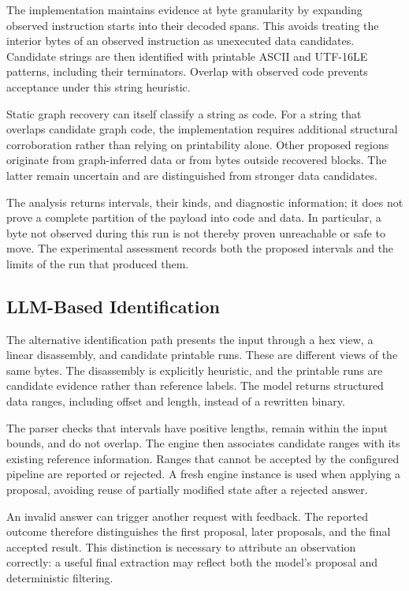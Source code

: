 The implementation maintains evidence at byte granularity by expanding
observed instruction starts into their decoded spans. This avoids
treating the interior bytes of an observed instruction as unexecuted
data candidates. Candidate strings are then identified with printable
ASCII and UTF-16LE patterns, including their terminators. Overlap with
observed code prevents acceptance under this string heuristic.

Static graph recovery can itself classify a string as code. For a
string that overlaps candidate graph code, the implementation requires
additional structural corroboration rather than relying on printability
alone. Other proposed regions originate from graph-inferred data or
from bytes outside recovered blocks. The latter remain uncertain and
are distinguished from stronger data candidates.

The analysis returns intervals, their kinds, and diagnostic information;
it does not prove a complete partition of the payload into code and
data. In particular, a byte not observed during this run is not thereby
proven unreachable or safe to move. The experimental assessment records
both the proposed intervals and the limits of the run that produced them.

\subsection{LLM-Based Identification}
The alternative identification path presents the input through a hex
view, a linear disassembly, and candidate printable runs. These are
different views of the same bytes. The disassembly is explicitly
heuristic, and the printable runs are candidate evidence rather than
reference labels. The model returns structured data ranges, including
offset and length, instead of a rewritten binary.

The parser checks that intervals have positive lengths, remain within
the input bounds, and do not overlap. The engine then associates
candidate ranges with its existing reference information. Ranges that
cannot be accepted by the configured pipeline are reported or rejected.
A fresh engine instance is used when applying a proposal, avoiding
reuse of partially modified state after a rejected answer.

An invalid answer can trigger another request with feedback. The
reported outcome therefore distinguishes the first proposal, later
proposals, and the final accepted result. This distinction is necessary
to attribute an observation correctly: a useful final extraction may
reflect both the model's proposal and deterministic filtering.

